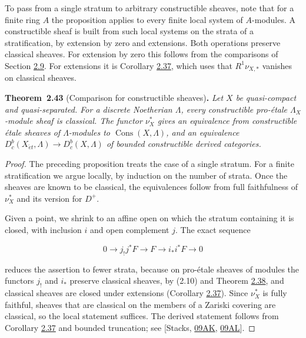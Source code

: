 \documentclass[11pt]{article}
\newenvironment{bpstatement}[2]{\par\addvspace{0.6\baselineskip}\noindent\textbf{#1}#2\textbf{.}\enspace\ignorespaces}
  {\par\addvspace{0.4\baselineskip}}
\newenvironment{bpstatementit}[2]{\begin{bpstatement}{#1}{#2}\itshape\ignorespaces}{\end{bpstatement}}
\providecommand{\Cons}{}\renewcommand{\Cons}{\operatorname{Cons}}
\providecommand{\Dbc}{}\renewcommand{\Dbc}{D^b_c}
\begin{document}
\label{bp126}%
To pass from a single stratum to arbitrary constructible sheaves, note that for a finite ring \(A\) the proposition applies to every finite local system of \(A\)-modules. A constructible sheaf is built from such local systems on the strata of a stratification, by extension by zero and extensions. Both operations preserve classical sheaves. For extension by zero this follows from the comparisons of Section \hyperref[bp109]{2.9}. For extensions it is Corollary \hyperref[bp107]{2.37}, which uses that \(R^1\nu_{X,*}\) vanishes on classical sheaves.

\label{bp127}%
\begin{bpstatementit}{Theorem~2.43}{ (Comparison for constructible sheaves)}
Let \(X\) be quasi-compact and quasi-separated. For a discrete Noetherian \(\Lambda\), every constructible pro-étale \(\Lambda_X\)-module sheaf is classical. The functor \(\nu_X^*\) gives an equivalence from constructible étale sheaves of \(\Lambda\)-modules to \(\Cons(X,\Lambda)\), and an equivalence \(D^b_c(X_{\acute{e}t},\Lambda)\to\Dbc(X,\Lambda)\) of bounded constructible derived categories.
\end{bpstatementit}

\begin{proof}[{Proof}]\label{bp128}%
The preceding proposition treats the case of a single stratum. For a finite stratification we argue locally, by induction on the number of strata. Once the sheaves are known to be classical, the equivalences follow from full faithfulness of \(\nu_X^*\) and its version for \(D^+\).

Given a point, we shrink to an affine open on which the stratum containing it is closed, with inclusion \(i\) and open complement \(j\). The exact sequence

\[
0\longrightarrow j_!j^*F\longrightarrow F
\longrightarrow i_*i^*F\longrightarrow0
\]

reduces the assertion to fewer strata, because on pro-étale sheaves of modules the functors \(j_!\) and \(i_*\) preserve classical sheaves, by (2.10) and Theorem \hyperref[bp111]{2.38}, and classical sheaves are closed under extensions (Corollary \hyperref[bp107]{2.37}). Since \(\nu_X^*\) is fully faithful, sheaves that are classical on the members of a Zariski covering are classical, so the local statement suffices. The derived statement follows from Corollary \hyperref[bp107]{2.37} and bounded truncation; see [Stacks, \href{https://stacks.math.columbia.edu/tag/09AK}{09AK}, \href{https://stacks.math.columbia.edu/tag/09AL}{09AL}].
\end{proof}
\end{document}
